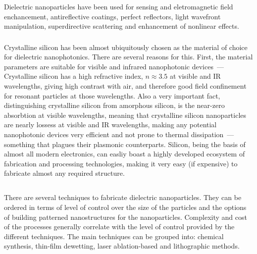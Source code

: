             Dielectric nanoparticles have been used for sensing and eletromagnetic field enchancement\cite{albella2013low,zambrana2015purcell,
        bakker2015magnetic,caldarola2015non}, antireflective coatings\cite{spinelli2012broadband},  perfect reflectors\cite{evlyukhin2010optical,
        moitra2014experimental}, light wavefront manipulation\cite{decker2015high,yu2015high}, superdirective scattering\cite{krasnok2014superdirective,
        krasnok2014experimental} and enhancement of nonlinear effects\cite{shcherbakov2014enhanced,makarov2015tuning}.

        \subsubsection{}
                Crystalline silicon has been almost ubiquitously chosen as the material of choice for dielectric nanophotonics.
            There are several reasons for this. First, the material parameters are suitable for visible and infrared nanophotonic devices~---
            Crystalline silicon has a high refractive index, $n \approx 3.5$ at visible and IR wavelengths\cite{li1980refractive}, giving high contrast
            with air, and therefore good field confinement for resonant particles at those wavelengths\cite{mie1908beitrage, dmitriev2016resonant}. Also
            a very important fact, distinguishing crystalline silicon from amorphous silicon, is the near-zero absorbtion at visible wavelengths, meaning
            that crystalline silicon nanoparticles are nearly lossess at visible and IR wavelengths, making any potential nanophotonic devices very
            efficient and not prone to thermal dissipation~--- something that plagues their plasmonic counterparts.
                Silicon, being the basis of almost all modern electronics, can easliy boast a highly developed ecosystem of fabrication and processing
            technologies, making it very easy (if expensive) to fabricate almost any required structure.

    \subsection{}
            There are several techniques to fabricate dielectric nanoparticles. They can be ordered in terms of level of control over the size
        of the particles and the options of building patterned nanostructures for the nanoparticles. Complexity and cost of the processes generally
        correlate with the level of control provided by the different techniques.
            The main techniques can be grouped into: chemical synthesis\cite{shi2012new}, thin-film dewetting\cite{abbarchi2014wafer},
        laser ablation-based\cite{zywietz2014laser} and lithographic methods.

